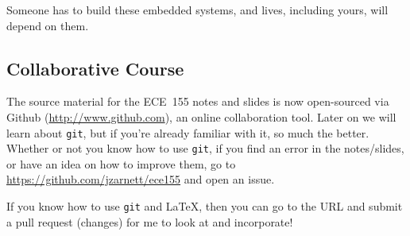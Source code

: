 Someone has to build these embedded systems, and lives, including yours, will depend on them.

\subsection*{Collaborative Course}
The source material for the ECE~155 notes and slides is now open-sourced via Github (\url{http://www.github.com}), an online collaboration tool. Later on we will learn about \texttt{git}, but if you're already familiar with it, so much the better. Whether or not you know how to use \texttt{git}, if you find an error in the notes/slides, or have an idea on how to improve them, go to \url{https://github.com/jzarnett/ece155} and open an issue. 

If you know how to use \texttt{git} and \LaTeX, then you can go to the URL and submit a pull request (changes) for me to look at and incorporate!



